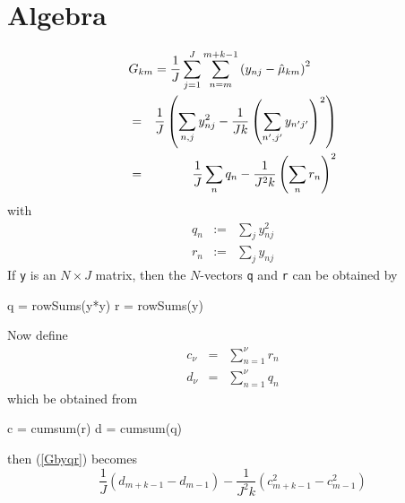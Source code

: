 \documentclass[11pt]{article}
\begin{document}
\section{Algebra}
\begin{eqnarray}
\lefteqn{G_{km} = \frac{1}{J} \sum_{j=1}^J \sum_{n=m}^{m+k-1} 
\left(y_{nj} - \hat{\mu}_{km} \right)^2} \\
%
&=& \frac{1}{J} \left( 
\sum_{n,j} y_{nj}^2 - \frac{1}{Jk} \left(\sum_{n',j'} y_{n'j'}\right)^2
\right) \\
%
&=& \frac{1}{J} \sum_n q_n - 
\frac{1}{J^2k}\left(\sum_n r_n\right)^2 \label{Gbyqr}
\end{eqnarray}
with
\begin{eqnarray}
q_n&:=&\sum_j  y_{nj}^2 \\
r_n&:=&\sum_j  y_{nj} 
\end{eqnarray}
If \texttt{y} is an $N\times J$ matrix, then the $N$-vectors \texttt{q} 
and \texttt{r} can be obtained by
\begin{Sinput}
q = rowSums(y*y)
r = rowSums(y) 
\end{Sinput}
Now define
\begin{eqnarray}
c_\nu &=& \sum_{n=1}^{\nu}r_n\\
d_\nu &=& \sum_{n=1}^{\nu}q_n
\end{eqnarray}
which be obtained from
\begin{Sinput}
c = cumsum(r) 
d = cumsum(q) 
\end{Sinput}
then (\ref{Gbyqr}) becomes
\begin{equation}
\frac{1}{J}(d_{m+k-1}-d_{m-1}) - 
\frac{1}{J^2k}(c_{m+k-1}^2-c_{m-1}^2)
\end{equation}





\end{document}
